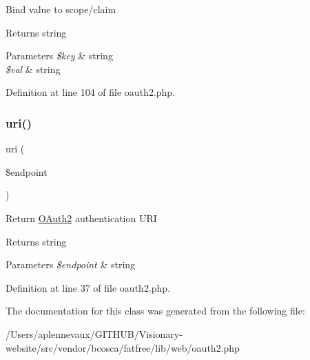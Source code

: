 Bind value to scope/claim \begin{DoxyReturn}{Returns}
string 
\end{DoxyReturn}

\begin{DoxyParams}{Parameters}
{\em \$key} & string \\
\hline
{\em \$val} & string \\
\hline
\end{DoxyParams}


Definition at line 104 of file oauth2.\+php.

\hypertarget{class_web_1_1_o_auth2_a52f2721541169726269393c6eaaf8f53}{}\label{class_web_1_1_o_auth2_a52f2721541169726269393c6eaaf8f53} 
\subsubsection{\texorpdfstring{uri()}{uri()}}
{\footnotesize\ttfamily uri (\begin{DoxyParamCaption}\item[{}]{\$endpoint }\end{DoxyParamCaption})}

Return \hyperlink{class_web_1_1_o_auth2}{O\+Auth2} authentication U\+RI \begin{DoxyReturn}{Returns}
string 
\end{DoxyReturn}

\begin{DoxyParams}{Parameters}
{\em \$endpoint} & string \\
\hline
\end{DoxyParams}


Definition at line 37 of file oauth2.\+php.



The documentation for this class was generated from the following file\+:\begin{DoxyCompactItemize}
\item 
/\+Users/aplennevaux/\+G\+I\+T\+H\+U\+B/\+Visionary-\/website/src/vendor/bcosca/fatfree/lib/web/oauth2.\+php\end{DoxyCompactItemize}
